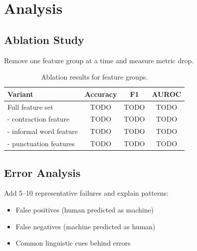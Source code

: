 \section{Analysis}

\subsection{Ablation Study}

Remove one feature group at a time and measure metric drop.

\begin{table}[t]
\centering
\begin{tabular}{lccc}
\toprule
Variant & Accuracy & F1 & AUROC \\
\midrule
Full feature set & TODO & TODO & TODO \\
- contraction feature & TODO & TODO & TODO \\
- informal word feature & TODO & TODO & TODO \\
- punctuation features & TODO & TODO & TODO \\
\bottomrule
\end{tabular}
\caption{Ablation results for feature groups.}
\label{tab:ablation}
\end{table}

\subsection{Error Analysis}

Add 5--10 representative failures and explain patterns:
\begin{itemize}
  \item False positives (human predicted as machine)
  \item False negatives (machine predicted as human)
  \item Common linguistic cues behind errors
\end{itemize}
